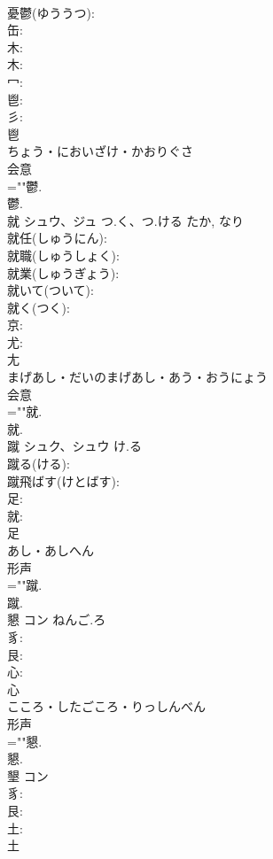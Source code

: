 \documentclass[8pt]{extreport}
\begin{document}
\begin{CJK}{UTF8}{min}
\\	憂鬱(ゆううつ): 
\\	缶: 
\\	木: 
\\	木: 
\\	冖: 
\\	鬯: 
\\	彡: 
\\	鬯	
\\	ちょう・においざけ・かおりぐさ	
\\	会意 
\\	=""鬱.
\\	鬱.
\\	就	シュウ、ジュ	つ.く、つ.ける	たか, なり	
\\	就任(しゅうにん): 
\\	就職(しゅうしょく): 
\\	就業(しゅうぎょう): 
\\	就いて(ついて): 
\\	就く(つく): 
\\	京: 
\\	尤: 
\\	尢	
\\	まげあし・だいのまげあし・あう・おうにょう	
\\	会意 
\\	=""就.
\\	就.
\\	蹴	シュク、シュウ	け.る		
\\	蹴る(ける): 
\\	蹴飛ばす(けとばす): 
\\	足: 
\\	就: 
\\	足	
\\	あし・あしへん	
\\	形声 
\\	=""蹴.
\\	蹴.
\\	懇	コン	ねんご.ろ		
\\	豸: 
\\	艮: 
\\	心: 
\\	心	
\\	こころ・したごころ・りっしんべん	
\\	形声 
\\	=""懇.
\\	懇.
\\	墾	コン			
\\	豸: 
\\	艮: 
\\	土: 
\\	土	

\end{CJK}
\end{document}
